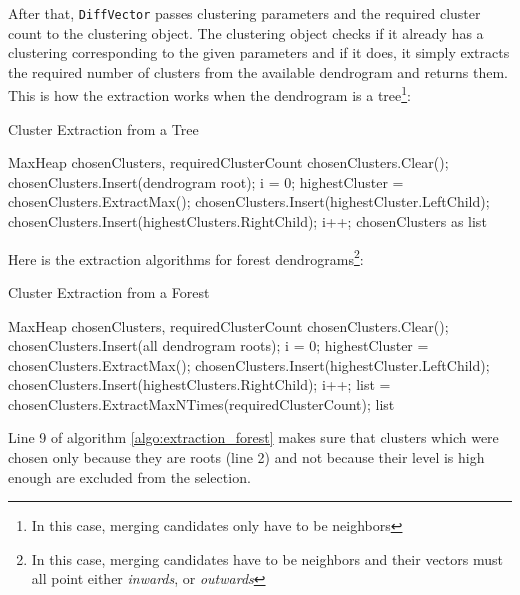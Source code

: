 After that, \verb+DiffVector+ passes clustering parameters and the required cluster count to the clustering object. The clustering object checks if it already has a clustering corresponding to the given parameters and if it does, it simply extracts the required number of clusters from the available dendrogram and returns them. This is how the extraction works when the dendrogram is a tree\footnote{In this case, merging candidates only have to be neighbors}:

\begin{algorithm}[H]
\caption{Cluster Extraction from a Tree}
\begin{algorithmic}[1]

\Require MaxHeap chosenClusters, requiredClusterCount
\Statex
\State chosenClusters.Clear();
\State chosenClusters.Insert(dendrogram root);
\State i = 0;
	\State highestCluster = chosenClusters.ExtractMax();
    \State chosenClusters.Insert(highestCluster.LeftChild);
    \State chosenClusters.Insert(highestClusters.RightChild);
    \State i++;
\EndWhile
\Statex
\Return chosenClusters as list
\end{algorithmic}
\end{algorithm}

Here is the extraction algorithms for forest dendrograms\footnote{In this case, merging candidates have to be neighbors and their vectors must all point either {\it inwards}, or {\it outwards}}:

\begin{algorithm}[H]
\caption{Cluster Extraction from a Forest}
\label{algo:extraction_forest}
\begin{algorithmic}[1]

\Require MaxHeap chosenClusters, requiredClusterCount
\Statex
\State chosenClusters.Clear();
\State chosenClusters.Insert(all dendrogram roots);
\State i = 0;
	\State highestCluster = chosenClusters.ExtractMax();
    \State chosenClusters.Insert(highestCluster.LeftChild);
    \State chosenClusters.Insert(highestClusters.RightChild);
    \State i++;
\EndWhile
\State list = chosenClusters.ExtractMaxNTimes(requiredClusterCount);
\Statex
\Return list
\end{algorithmic}
\end{algorithm}

Line 9 of algorithm \ref{algo:extraction_forest} makes sure that clusters which were chosen only because they are roots (line 2) and not because their level is high enough are excluded from the selection.

